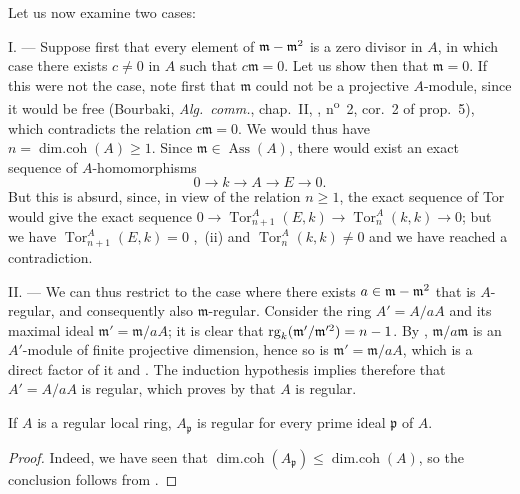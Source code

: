 Let us now examine two cases:

\medskip\noindent I. ---
Suppose first that every element of $\mathfrak{m}-\mathfrak{m}^2$ is a zero divisor in $A$, in which case  there exists $c\neq 0$ in $A$ such that $c\mathfrak{m}=0$.
Let us show then that $\mathfrak{m}=0$.
If this were not the case, note first that $\mathfrak{m}$ could not be a projective $A$-module, since it would be free (Bourbaki, \emph{Alg.~comm.}, chap.~II, , n\textsuperscript{o}~2, cor.~2 of prop.~5), which contradicts the relation $c\mathfrak{m}=0$.
We would thus have $n=\operatorname{dim.coh}(A)\geq 1$.
Since $\mathfrak{m}\in\operatorname{Ass}(A)$, there would exist an exact sequence of $A$-homomorphisms
\[
  0\to k\to A\to E\to 0.
\]
But this is absurd, since, in view of the relation $n\geq 1$, the exact sequence of Tor would give the exact sequence $0\to\operatorname{Tor}^A_{n+1}(E,k)\to\operatorname{Tor}^A_n(k,k)\to 0$;
but we have $\operatorname{Tor}^A_{n+1}(E,k)=0$ ,~(ii) and $\operatorname{Tor}^A_n(k,k)\neq 0$  and we have reached a contradiction.

\medskip\noindent II. ---
We can thus restrict to the case where there exists $a\in\mathfrak{m}-\mathfrak{m}^2$ that is $A$-regular, and consequently also $\mathfrak{m}$-regular.
Consider the ring $A'=A/aA$ and its maximal ideal $\mathfrak{m}'=\mathfrak{m}/aA$;
it is clear that $\operatorname{rg}_k(\mathfrak{m}'/\mathfrak{m}'^2)=n- 1$.
By , $\mathfrak{m}/a\mathfrak{m}$ is an $A'$-module of finite projective dimension, hence so is $\mathfrak{m}'=\mathfrak{m}/aA$, which is a direct factor of it  and .
The induction hypothesis implies therefore that $A'=A/aA$ is regular, which proves by  that $A$ is regular.

\begin{corollary}[17.3.2]
\label{0.17.3.2}
If $A$ is a regular local ring, $A_\mathfrak{p}$ is regular for every prime ideal $\mathfrak{p}$ of $A$.
\end{corollary}

\begin{proof}
Indeed, we have seen  that $\operatorname{dim.coh}(A_\mathfrak{p})\leq\operatorname{dim.coh}(A)$, so the conclusion follows from .
\end{proof}

